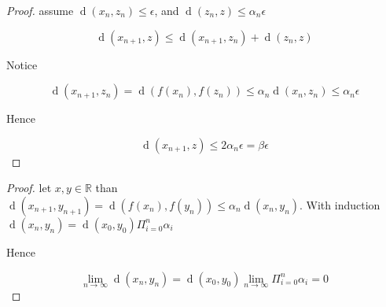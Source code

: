 \begin{proof}
  assume $\mathop{d}(x_{n}, z_{n}) \le \epsilon$, and $\mathop{d}(z_{n}, z) \le \alpha_{n}\epsilon$ 

  \[
  \mathop{d}(x_{n+1}, z) \le \mathop{d}(x_{n+1}, z_{n}) + \mathop{d}(z_{n}, z)
  \]

  Notice

  \[
  \mathop{d}(x_{n+1}, z_{n}) = \mathop{d}(f(x_{n}), f(z_{n})) \le \alpha_{n} \mathop{d}(x_{n}, z_{n}) \le \alpha_{n} \epsilon
  \]

  Hence

  \[
  \mathop{d}(x_{n+1}, z) \le 2 \alpha_{n} \epsilon = \beta \epsilon
  \]
\end{proof}

\begin{proof}
  let $x,y \in \mathbb{R}$ than $\mathop{d}(x_{n+1}, y_{n+1}) =
  \mathop{d}(f(x_{n}), f(y_{n})) \le \alpha_{n}\mathop{d}(x_{n}, y_{n})$. With
  induction $\mathop{d}(x_{n}, y_{n}) = \mathop{d}(x_{0}, y_{0})\Pi_{i=0}^{n} \alpha_{i}$

  Hence

  \[
  \lim_{n \rightarrow \infty} \mathop{d}(x_{n}, y_{n}) = \mathop{d}(x_{0}, y_{0})\lim_{n \rightarrow \infty} \Pi_{i=0}^{n} \alpha_{i} = 0
  \]

\end{proof}
